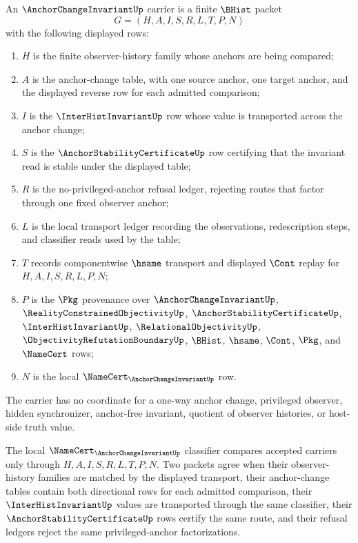 \begin{definition}
\label{def:anchor-change-invariant-carrier}
An $\AnchorChangeInvariantUp$ carrier is a finite $\BHist$ packet
$$
G=(H,A,I,S,R,L,T,P,N)
$$
with the following displayed rows:
\begin{enumerate}
\item $H$ is the finite observer-history family whose anchors are being compared;
\item $A$ is the anchor-change table, with one source anchor, one target anchor, and the displayed reverse row for each admitted comparison;
\item $I$ is the $\InterHistInvariantUp$ row whose value is transported across the anchor change;
\item $S$ is the $\AnchorStabilityCertificateUp$ row certifying that the invariant read is stable under the displayed table;
\item $R$ is the no-privileged-anchor refusal ledger, rejecting routes that factor through one fixed observer anchor;
\item $L$ is the local transport ledger recording the observations, redescription steps, and classifier reads used by the table;
\item $T$ records componentwise $\hsame$ transport and displayed $\Cont$ replay for $H,A,I,S,R,L,P,N$;
\item $P$ is the $\Pkg$ provenance over $\AnchorChangeInvariantUp$, $\RealityConstrainedObjectivityUp$, $\AnchorStabilityCertificateUp$, $\InterHistInvariantUp$, $\RelationalObjectivityUp$, $\ObjectivityRefutationBoundaryUp$, $\BHist$, $\hsame$, $\Cont$, $\Pkg$, and $\NameCert$ rows;
\item $N$ is the local $\NameCert_{\AnchorChangeInvariantUp}$ row.
\end{enumerate}
The carrier has no coordinate for a one-way anchor change, privileged observer, hidden synchronizer, anchor-free invariant, quotient of observer histories, or host-side truth value.
\end{definition}

\begin{definition}
\label{def:anchor-change-invariant-classifier}
The local $\NameCert_{\AnchorChangeInvariantUp}$ classifier compares accepted carriers only through $H,A,I,S,R,L,T,P,N$. Two packets agree when their observer-history families are matched by the displayed transport, their anchor-change tables contain both directional rows for each admitted comparison, their $\InterHistInvariantUp$ values are transported through the same classifier, their $\AnchorStabilityCertificateUp$ rows certify the same route, and their refusal ledgers reject the same privileged-anchor factorizations.
\end{definition}

